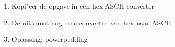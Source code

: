 \begin{enumerate}
  \item Kopi"eer de opgave in een hex-ASCII converter
  \item De uitkomst nog eens converten van hex naar ASCII
  \item Oplossing: powerpudding
\end{enumerate}